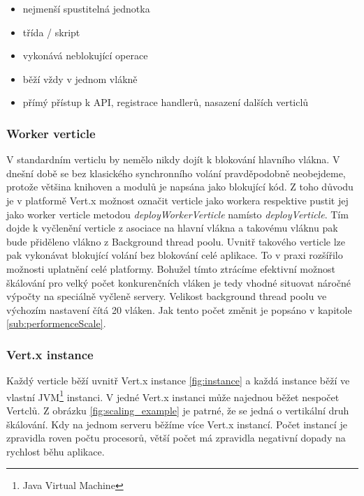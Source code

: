\begin{itemize}
\item nejmenší spustitelná jednotka
\item třída / skript
\item vykonává neblokující operace
\item běží vždy v jednom vlákně
\item přímý přístup k API, registrace handlerů, nasazení dalších verticlů
\end{itemize}

\subsubsection{Worker verticle}

V standardním verticlu by nemělo nikdy dojít k blokování hlavního vlákna. V dnešní době se bez klasického synchronního volání pravděpodobně neobejdeme, protože většina knihoven a modulů je napsána jako blokující kód. Z toho důvodu je v platformě Vert.x možnost označit verticle jako workera respektive pustit jej jako worker verticle metodou \emph{deployWorkerVerticle} namísto \emph{deployVerticle}. Tím dojde k vyčlenění verticle z asociace na hlavní vlákna a takovému vláknu pak bude přiděleno vlákno z Background thread poolu. Uvnitř takového verticle lze pak vykonávat blokující volání bez blokování celé aplikace. To v praxi rozšířilo možnosti uplatnění celé platformy. Bohužel tímto ztrácíme efektivní možnost škálování pro velký počet konkurenčních vláken je tedy vhodné situovat náročné výpočty na speciálně vyčleně servery. Velikost background thread poolu ve výchozím nastavení čítá 20 vláken. Jak tento počet změnit je popsáno v kapitole \ref{sub:performenceScale}.

\subsubsection{Vert.x instance}

Každý verticle běží uvnitř Vert.x instance \vref{fig:instance} a každá instance běží ve vlastní JVM\footnote{Java Virtual Machine} instanci. V jedné Vert.x instanci může najednou běžet nespočet Vertclů. Z obrázku \ref{fig:scaling_example} je patrné, že se jedná o vertikální druh škálování. Kdy na jednom serveru běžíme více Vert.x instancí. Počet instancí je zpravidla roven počtu procesorů, větší počet má zpravidla negativní dopady na rychlost běhu aplikace.

